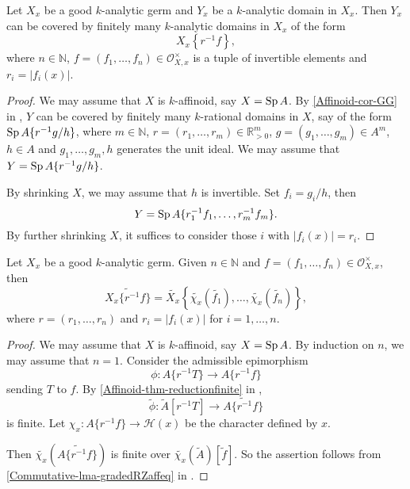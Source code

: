 \begin{lemma}\label{lma-analyticdomainingood1}
    Let $X_x$ be a good $k$-analytic germ and $Y_x$ be a $k$-analytic domain in $X_x$. Then $Y_x$ can be covered by finitely many $k$-analytic domains in $X_x$ of the form
    \[
        X_x\left\{r^{-1}f \right\},  
    \]
    where $n\in \mathbb{N}$, $f=(f_1,\ldots,f_n)\in \mathcal{O}_{X,x}^{\times}$ is a tuple of invertible elements and $r_i=|f_i(x)|$.
\end{lemma}
\begin{proof}
    We may assume that $X$ is $k$-affinoid, say $X=\operatorname{Sp} A$. By \cref{Affinoid-cor-GG} in , $Y$ can be covered by finitely many $k$-rational domains in $X$, say of the form $\operatorname{Sp} A\{r^{-1}g/h\}$, where $m\in \mathbb{N}$, $r=(r_1,\ldots,r_m)\in \mathbb{R}_{>0}^m$, $g=(g_1,\ldots,g_m)\in A^m$, $h\in A$ and $g_1,\ldots,g_m,h$ generates the unit ideal. We may assume that $Y=\operatorname{Sp} A\{r^{-1}g/h\}$.
    
    By shrinking $X$, we may assume that $h$ is invertible. Set $f_i=g_i/h$, then 
    \[
        Y=\operatorname{Sp} A\{r_1^{-1}f_1,\ldots,r_m^{-1}f_m\}.  
    \]
    By further shrinking $X$, it suffices to consider those $i$ with $|f_i(x)|=r_i$.
\end{proof}



\begin{lemma}\label{lma-affinoiddomainreductionspecial2}
    Let $X_x$ be a good $k$-analytic germ. Given $n\in \mathbb{N}$ and $f=(f_1,\ldots,f_n)\in \mathcal{O}_{X,x}^{\times}$, then
    \[
       \widetilde{X_x\{r^{-1}f\}}=\widetilde{X_x}\left\{\widetilde{\chi_x}(\tilde{f_1}),\ldots,\widetilde{\chi_x}(\tilde{f_n})\right\},  
    \]
    where $r=(r_1,\ldots,r_n)$ and $r_i=|f_i(x)|$ for $i=1,\ldots,n$.
\end{lemma}
\begin{proof}
    We may assume that $X$ is $k$-affinoid, say $X=\operatorname{Sp} A$. By induction on $n$, we may assume that $n=1$. Consider the admissible epimorphism
    \[
        \phi:A\{r^{-1}T\}\rightarrow A\{r^{-1}f\}  
    \]
    sending $T$ to $f$. By \cref{Affinoid-thm-reductionfinite} in , 
    \[
        \tilde{\phi}:\tilde{A}[r^{-1}T]\rightarrow \widetilde{A\{r^{-1}f\}}
    \]
    is finite. Let $\chi_x:A\{r^{-1}f\}\rightarrow \mathscr{H}(x)$ be the character defined by $x$.
    
    Then $\widetilde{\chi_x}(\widetilde{A\{r^{-1}f\}})$ is finite over $\widetilde{\chi_x}(\tilde{A})[\tilde{f}]$. So the assertion follows from \cref{Commutative-lma-gradedRZaffeq} in .
\end{proof}


